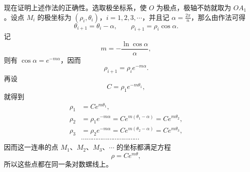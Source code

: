 现在证明上述作法的正确性。选取极坐标系，使 $O$ 为极点，极轴不妨就取为 $OA_1$。设点 $M_i$ 的极坐标为 $(\rho_i, \theta_i)$，$i = 1, 2, 3, \cdots$，并且记 $\alpha = \frac{2\pi}{n}$，那么由作法可得
\[
  \theta_{i+1} = \theta_i - \alpha, \qquad \rho_{i+1} = \rho_i \cos\alpha.
\]
记
\[
  m = -\frac{\ln\cos\alpha}{\alpha},
\]
则有 $\cos\alpha = e^{-m\alpha}$，因而
\[
  \rho_{i+1} = \rho_i e^{-m\alpha}.
\]
再设
\[
  C = \rho_1 e^{-m\theta_1},
\]
就得到
\begin{align*}
  \rho_1 &= C e^{m\theta_1}, \\
  \rho_2 &= \rho_1 e^{-m\alpha} = C e^{m(\theta_1 - \alpha)} = C e^{m\theta_2}, \\
  \rho_3 &= \rho_2 e^{-m\alpha} = C e^{m(\theta_2 - \alpha)} = C e^{m\theta_3}, \\
  &\cdots\cdots\cdots\cdots\cdots\cdots\cdots\cdots\cdots\cdots\cdots
\end{align*}
因而这一连串的点 $M_1$、$M_2$、$M_3$、$\cdots$ 的坐标都满足方程
\[
  \rho = C e^{m\theta},
\]
所以这些点都在同一条对数螺线上。
